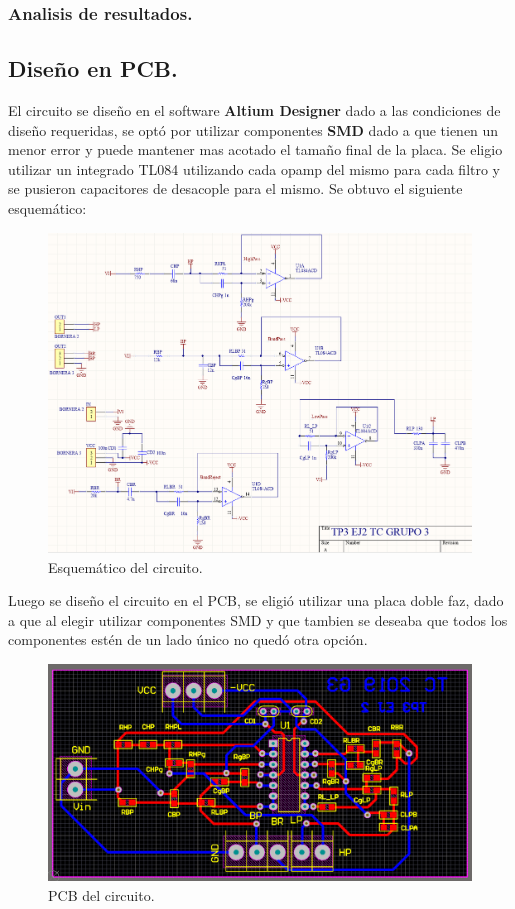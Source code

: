 \documentclass[a4paper]{article}
\begin{document}
\subsubsection{Analisis de resultados.}
\subsection{Diseño en PCB.}
El circuito se diseño en el software \textbf{Altium Designer} dado a las condiciones de diseño requeridas, se optó por utilizar componentes \textbf{SMD} dado a que tienen un menor error y puede mantener mas acotado el tamaño final de la placa.
Se eligio utilizar un integrado TL084 utilizando cada opamp del mismo  para cada filtro y se pusieron capacitores de desacople para el mismo. Se obtuvo el siguiente esquemático:
\begin{figure}[H]	
	\centering
	\includegraphics[width=\textwidth]{ImagenesEj2/esquematico.PNG}
	\caption{Esquemático del circuito.}
	\label{fig:esq}
\end{figure}
Luego se diseño el circuito en el PCB, se eligió utilizar una placa doble faz, dado a que al elegir utilizar componentes SMD y que tambien se deseaba que todos los componentes estén de un lado único no quedó otra opción.
\begin{figure}[H]	
	\centering
	\includegraphics[width=\textwidth]{ImagenesEj2/pcb.PNG}
	\caption{PCB del circuito.}
	\label{fig:pcb}
\end{figure}
\end{document}
